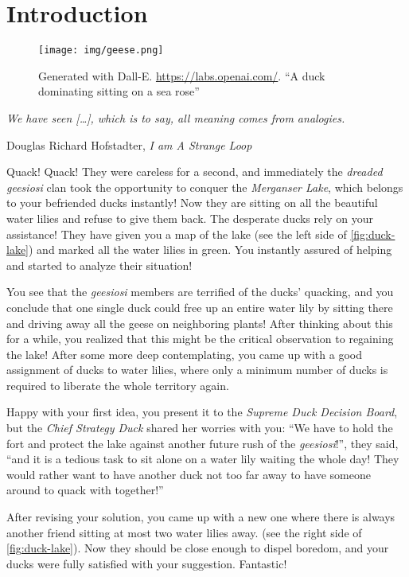 \chapter{Introduction}\label{ch:introduction}

\vspace*{-50pt}

\begin{figure}[ht]
        \texttt{[image: img/geese.png]}
        \captionsetup{textformat=empty,labelformat=blank}
        \caption{Generated with Dall-E. \url{https://labs.openai.com/}. ``A duck dominating sitting on a sea rose''}
\end{figure}

\epigraph{\itshape We have seen [\ldots], which is to say, all meaning comes from analogies.}{Douglas Richard Hofstadter, \textit{I am A Strange Loop}}

Quack! Quack! They were careless for a second, and immediately the \textit{dreaded geesiosi} clan took the opportunity to conquer the  \textit{Merganser Lake}, which belongs to your befriended ducks instantly! %
Now they are sitting on all the beautiful water lilies and refuse to give them back. The desperate ducks rely on your assistance!
They have given you a map of the lake (see the left side of \cref{fig:duck-lake}) and marked all the water lilies in green.
You instantly assured of helping and started to analyze their situation!

You see that the \textit{geesiosi} members are terrified of the ducks' quacking, and you conclude that one single duck could free up an entire water lily by sitting there and driving away all the geese on neighboring plants! 
After thinking about this for a while, you realized that this might be the critical observation to regaining the lake!
After some more deep contemplating, you came up with a good assignment of ducks to water lilies, where only a minimum number of ducks is required to liberate the whole territory again.

Happy with your first idea, you present it to the \textit{Supreme Duck Decision Board}, but the \textit{Chief Strategy Duck} shared her worries with you: 
``We have to hold the fort and protect the lake against another future rush of the \textit{geesiosi}!'', they said, ``and it is a tedious task to sit alone on a water lily waiting the whole day! They would rather want to have another duck not too far away to have someone around to quack with together!''

After revising your solution, you came up with a new one where there is always another friend sitting at most two water lilies away. (see the right side of \cref{fig:duck-lake}). 
Now they should be close enough to dispel boredom, and your ducks were fully satisfied with your suggestion. 
Fantastic!

